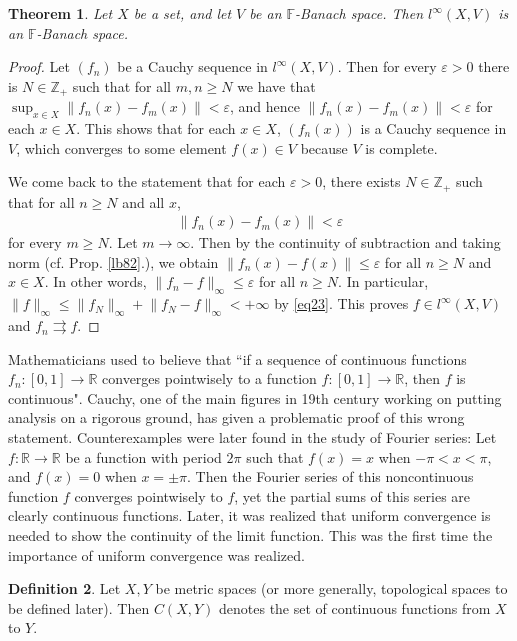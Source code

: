 \documentclass[12pt,b5paper,notitlepage]{article}
\theoremstyle{definition}
\newtheorem{df}{Definition}[section]
\theoremstyle{plain}
\newtheorem{thm}[df]{Theorem}
\newcommand{\Zbb}{\mathbb Z}
\newcommand{\Rbb}{\mathbb R}
\newcommand{\Fbb}{\mathbb F}
\newcommand{\eps}{\varepsilon}
\numberwithin{equation}{section}
\begin{document}
\begin{thm}\label{lb85}
Let $X$ be a set, and let $V$ be an $\Fbb$-Banach space. Then $l^\infty(X,V)$ is an $\Fbb$-Banach space.
\end{thm}


\begin{proof}
Let $(f_n)$ be a Cauchy sequence in $l^\infty(X,V)$. Then for every $\eps>0$ there is $N\in\Zbb_+$ such that for all $m,n\geq N$ we have that $\sup_{x\in X}\lVert f_n(x)-f_m(x)\lVert <\eps$, and hence $\lVert f_n(x)-f_m(x)\lVert <\eps$ for each $x\in X$. This shows that for each $x\in X$, $(f_n(x))$ is a Cauchy sequence in $V$, which converges to some element $f(x)\in V$ because $V$ is complete.

We come back to the statement that for each $\eps>0$, there exists $N\in\Zbb_+$ such that for all $n\geq N$ and all $x$,
\begin{align*}
\lVert f_n(x)-f_m(x)\lVert <\eps  
\end{align*}
for every $m\geq N$. Let $m\rightarrow\infty$. Then by the continuity of subtraction and taking norm (cf. Prop. \ref{lb82}.), we obtain $\lVert f_n(x)-f(x)\lVert\leq \eps$ for all $n\geq N$ and $x\in X$. In other words, $\lVert f_n-f\lVert_\infty\leq\eps$ for all $n\geq N$. In particular, $\lVert f\lVert_\infty\leq\lVert f_N\lVert_\infty +\lVert f_N-f\lVert_\infty<+\infty$ by \eqref{eq23}. This proves $f\in l^\infty(X,V)$ and $f_n\rightrightarrows f$.
\end{proof}


Mathematicians used to believe that ``if a sequence of continuous functions $f_n:[0,1]\rightarrow\Rbb$ converges pointwisely to a function $f:[0,1]\rightarrow\Rbb$, then $f$ is continuous". Cauchy, one of the main figures in 19th century working on putting analysis on a rigorous ground, has given a problematic proof of this wrong statement. Counterexamples were later found in the study of Fourier series: Let $f:\Rbb\rightarrow\Rbb$ be a function with period $2\pi$ such that $f(x)=x$ when $-\pi<x<\pi$, and $f(x)=0$ when $x=\pm \pi$. Then the Fourier series  of this noncontinuous function $f$ converges pointwisely to $f$, yet the partial sums of this series are clearly continuous functions. Later, it was realized that uniform convergence is needed to show the continuity of the limit function. This was the first time the importance of uniform convergence was realized.

\begin{df}
Let $X,Y$ be  metric spaces (or more generally, topological spaces to be defined later). Then $C(X,Y)$  denotes the set of continuous functions from $X$ to $Y$. 
\end{df}
\end{document}
